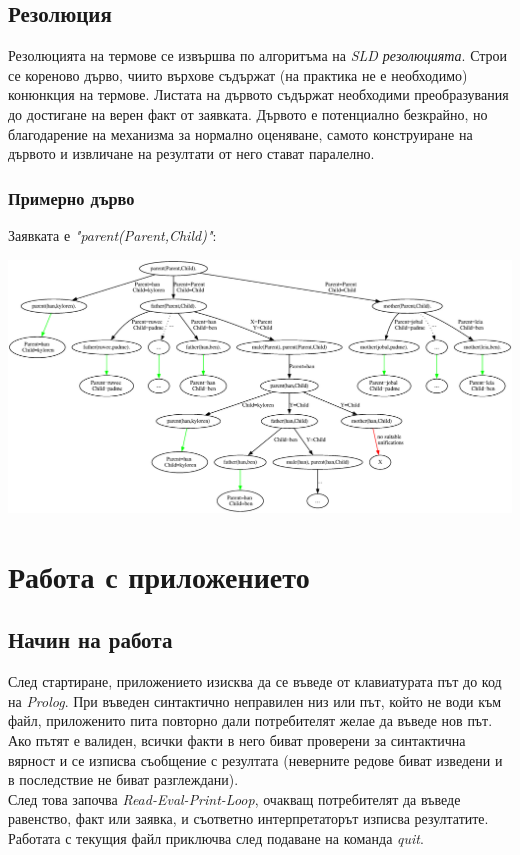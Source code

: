 \documentclass[15pt]{extarticle}
\begin{document}
	\begin{landscape}
	
	\subsection{Резолюция}
	
	Резолюцията на термове се извършва по алгоритъма на \emph{SLD резолюцията}. Строи се кореново дърво, чиито върхове съдържат (на практика не е необходимо) конюнкция на термове. Листата на дървото съдържат необходими преобразувания до достигане на верен факт от заявката. Дървото е потенциално безкрайно, но благодарение на механизма за нормално оценяване, самото конструиране на дървото и извличане на резултати от него стават паралелно.

	\subsubsection{Примерно дърво}
	
	 Заявката е \emph{"parent(Parent,Child)"}:
	
	\begin{center}
		\includegraphics[scale=.58]{assets/rTree.eps}
	\end{center}
	
	\end{landscape}
	
	\section{Работа с приложението}
	
	\subsection{Начин на работа}
	
	След стартиране, приложението изисква да се въведе от клавиатурата път до код на \emph{Prolog}. При въведен синтактично неправилен низ или път, който не води към файл, приложенито пита повторно дали потребителят желае да въведе нов път. Ако пътят е валиден, всички факти в него биват проверени за синтактична вярност и се изписва съобщение с резултата (неверните редове биват изведени и в последствие не биват разглеждани).\\
	След това започва \emph{Read-Eval-Print-Loop}, очакващ потребителят да въведе равенство, факт или заявка, и съответно интерпретаторът изписва резултатите.\\
	Работата с текущия файл приключва след подаване на команда \emph{quit}.
	
\end{document}

